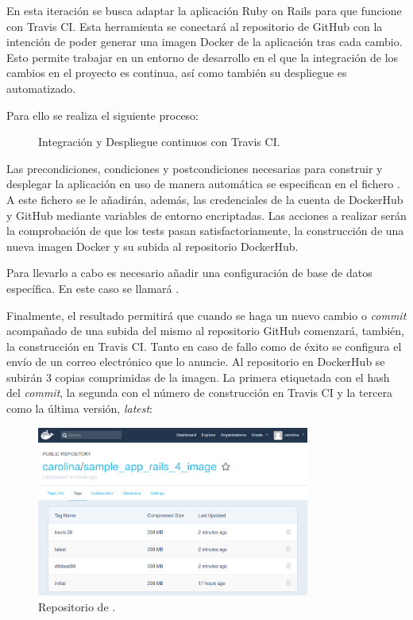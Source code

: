 En esta iteración se busca adaptar la aplicación Ruby on Rails para que funcione con Travis CI. Esta herramienta se conectará al repositorio de GitHub  con la intención de poder generar una imagen Docker de la aplicación tras cada cambio. Esto permite trabajar en un entorno de desarrollo en el que la integración de los cambios en el proyecto es continua, así como también su despliegue es automatizado.

Para ello se realiza el siguiente proceso:
\begin{figure}[H]
\caption{Integración y Despliegue continuos con Travis CI.}
\end{figure}

Las precondiciones, condiciones y postcondiciones necesarias para construir y desplegar la aplicación en uso de manera automática se especifican en el fichero . A este fichero se le añadirán, además, las credenciales de la cuenta de DockerHub y GitHub mediante variables de entorno encriptadas. Las acciones a realizar serán la comprobación de que los tests pasan satisfactoriamente, la construcción de una nueva imagen Docker y su subida al repositorio DockerHub.

Para llevarlo a cabo es necesario añadir una configuración de base de datos específica. En este caso se llamará .

Finalmente, el resultado permitirá que cuando se haga un nuevo cambio o \textit{commit} acompañado de una subida del mismo al repositorio GitHub comenzará, también, la construcción en Travis CI. Tanto en caso de fallo como de éxito se configura el envío de un correo electrónico que lo anuncie. Al repositorio en DockerHub se subirán 3 copias comprimidas de la imagen. La primera etiquetada con el hash del \textit{commit}, la segunda con el número de construcción en Travis CI y la tercera como la última versión, \textit{latest}:

\begin{figure}[H]
\centering
\includegraphics[width=0.8\textwidth]{images/figures/dockerhubimages.png}
\caption{Repositorio de .\label{fig:dockerhub_images}}
\end{figure}

